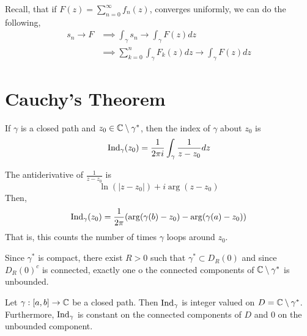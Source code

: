 \documentclass[12pt]{amsart}
\begin{document}
\begin{remark}
    Recall, that if  $F(z) = \sum_{n=0}^\infty f_n(z)$, converges uniformly, we can do the following, 
    \begin{align*}
        s_n \to F &\implies \int_\gamma s_n \to \int_\gamma F(z)dz  \\
        &\implies \sum_{k=0}^n \int_\gamma F_k(z)dz \to \int_\gamma F(z)dz 
    \end{align*}
\end{remark}

\section{Cauchy's Theorem}

\begin{definition}
    If $\gamma$ is a closed path and $z_0 \in \mathbb C \setminus \gamma^*$, then the index of $\gamma$ about $z_0$ is 
    \begin{align*}
        \operatorname{Ind}_\gamma(z_0) = \frac{1}{2\pi i} \int_\gamma \frac{1}{z-z_0} dz
    \end{align*}
\end{definition}

The antiderivative of $\frac{1}{z-z_0}$ is 
\[ \ln(|z-z_0|) +i\arg(z-z_0)\]
Then, 
\begin{align*}
    \operatorname{Ind}_\gamma(z_0) = \frac{1}{2\pi}(\arg(\gamma(b)-z_0) -\arg(\gamma(a)-z_0))
\end{align*}
That is, this counts the number of times $\gamma$ loops around $z_0$.

\begin{remark}
    Since $\gamma^*$ is compact, there exist $R > 0$ such that $\gamma^* \subset D_R(0)$ and since $D_R(0)^c$ is connected, exactly one o the connected components of $\mathbb C \setminus \gamma^*$ is unbounded. 
\end{remark}

\begin{theorem}
    Let $\gamma: [a,b] \to \mathbb C$ be a closed path. Then $\operatorname{Ind}_\gamma$ is integer valued on $D = \mathbb C \setminus \gamma^*$. Furthermore, $\operatorname{Ind}_\gamma$ is constant on the connected components of $D$ and $0$ on the unbounded component. 
\end{theorem}
\end{document}
